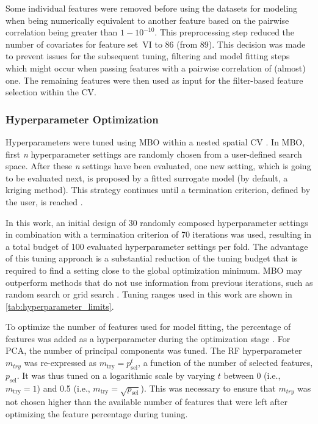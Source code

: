 \documentclass[remotesensing,article,submit,moreauthors,pdftex]{Definitions/mdpi}
\begin{document}
Some individual features were removed before using the datasets for modeling when being numerically equivalent to another feature based on the pairwise correlation being greater than $1 - 10^{-10}$.
This preprocessing step reduced the number of covariates for feature set~VI to 86 (from 89).
This decision was made to prevent issues for the subsequent tuning, filtering and model fitting steps which might occur when passing features with a pairwise correlation of (almost) one.
The remaining features were then used as input for the filter-based feature selection within the CV.


\subsubsection{Hyperparameter Optimization}

Hyperparameters were tuned using \ac{MBO} within a nested spatial \ac{CV} \cite{mlrmbo, binder2020, schratz2019}.
In MBO, first \textit{n} hyperparameter settings are randomly chosen from a user-defined search space.
After these \textit{n} settings have been evaluated, one new setting, which is going to be evaluated next, is proposed by a fitted surrogate model (by default, a kriging method).
This strategy continues until a termination criterion, defined by the user, is reached \cite{hutter2011, jones1998}.

In this work, an initial design of 30 randomly composed hyperparameter settings in combination with a termination criterion of 70 iterations was used, resulting in a total budget of 100 evaluated hyperparameter settings per fold.
The advantage of this tuning approach is a substantial reduction of the tuning budget that is required to find a setting close to the global optimization minimum.
\ac{MBO} may outperform methods that do not use information from previous iterations, such as random search or grid search \cite{bergstra2012}.
Tuning ranges used in this work are shown in \autoref{tab:hyperparameter_limits}.

To optimize the number of features used for model fitting, the percentage of features was added as a hyperparameter during the optimization stage \cite{binder2020}.
For \ac{PCA}, the number of principal components was tuned.
The RF hyperparameter \texttt{\(m_{try}\)} was re-expressed as $m_\textrm{try} = p_\textrm{sel}^t$, a function of the number of selected features, $p_\textrm{sel}$.
It was thus tuned on a logarithmic scale by varying $t$ between 0 (i.e., $m_\textrm{try} = 1$) and 0.5 (i.e., $m_\textrm{try}=\sqrt{p_\textrm{sel}}$).
This was necessary to ensure that \texttt{\(m_{try}\)} was not chosen higher than the available number of features that were left after optimizing the feature percentage during tuning.
\end{document}
